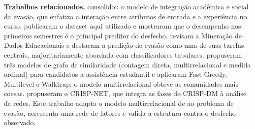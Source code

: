 \textbf{Trabalhos relacionados.} \citet{tinto1975} consolidou o modelo de integração acadêmica e social da evasão, que enfatiza a interação entre atributos de entrada e a experiência no curso. \citet{realinho2022} publicaram o dataset aqui utilizado e mostraram que o desempenho nos primeiros semestres é o principal preditor do desfecho. \citet{romero2020} revisam a Mineração de Dados Educacionais e destacam a predição de evasão como uma de suas tarefas centrais, majoritariamente abordada com classificadores tabulares. \citet{porto2025} propuseram três modelos de grafo de similaridade (contagem direta, multirrelacional e medida ordinal) para candidatos a assistência estudantil e aplicaram Fast Greedy, Multilevel e Walktrap; o modelo multirrelacional obteve as comunidades mais coesas. \citet{acuna2025} propuseram o CRISP-NET, que integra as fases do CRISP-DM à análise de redes. Este trabalho adapta o modelo multirrelacional de \citet{porto2025} ao problema de evasão, acrescenta uma rede de fatores e valida a estrutura contra o desfecho observado.
